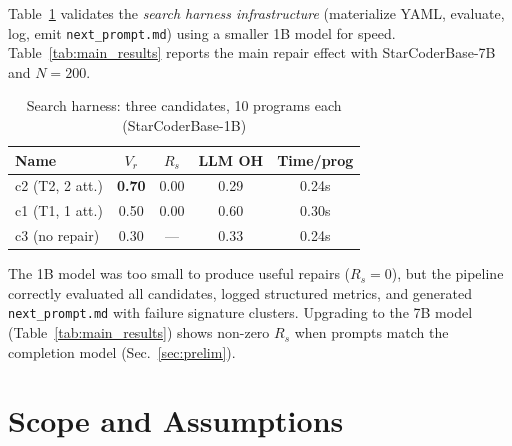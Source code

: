 \documentclass[conference]{IEEEtran}
\begin{document}
Table~\ref{tab:search_r1} validates the \emph{search harness infrastructure} (materialize YAML, evaluate, log, emit \texttt{next\_prompt.md}) using a smaller 1B model for speed. Table~\ref{tab:main_results} reports the main repair effect with StarCoderBase-7B and $N{=}200$.

\begin{table}[t]
\centering
\caption{Search harness: three candidates, 10 programs each (StarCoderBase-1B)}
\label{tab:search_r1}
\begin{tabular}{lcccc}
\toprule
\textbf{Name} & $V_r$ & $R_s$ & \textbf{LLM OH} & \textbf{Time/prog} \\
\midrule
c2 (T2, 2 att.) & \textbf{0.70} & 0.00 & 0.29 & 0.24s \\
c1 (T1, 1 att.) & 0.50 & 0.00 & 0.60 & 0.30s \\
c3 (no repair) & 0.30 & --- & 0.33 & 0.24s \\
\bottomrule
\end{tabular}
\end{table}

The 1B model was too small to produce useful repairs ($R_s = 0$), but the pipeline correctly evaluated all candidates, logged structured metrics, and generated \texttt{next\_prompt.md} with failure signature clusters. Upgrading to the 7B model (Table~\ref{tab:main_results}) shows non-zero $R_s$ when prompts match the completion model (Sec.~\ref{sec:prelim}).

\section{Scope and Assumptions}
\end{document}
